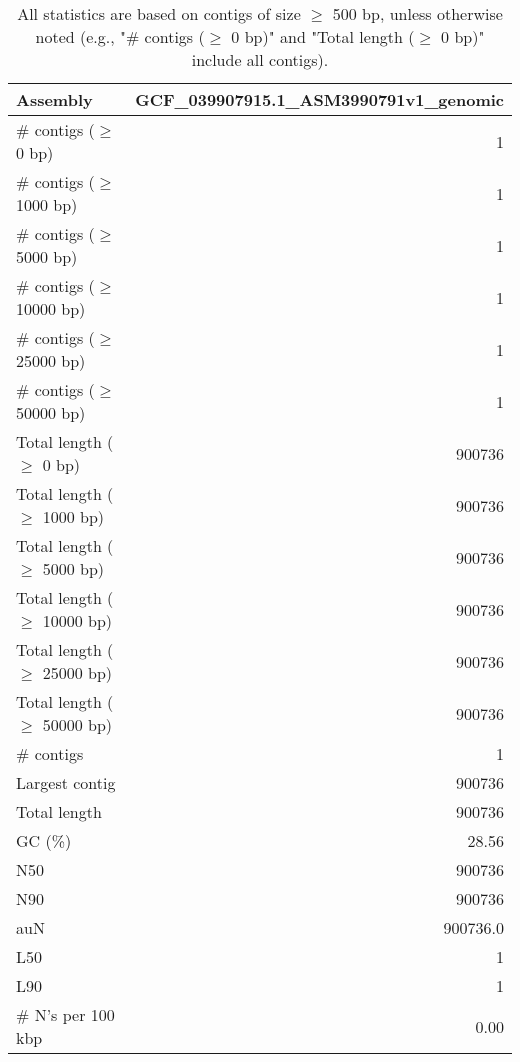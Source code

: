 \documentclass[12pt,a4paper]{article}
\begin{document}
\begin{table}[ht]
\begin{center}
\caption{All statistics are based on contigs of size $\geq$ 500 bp, unless otherwise noted (e.g., "\# contigs ($\geq$ 0 bp)" and "Total length ($\geq$ 0 bp)" include all contigs).}
\begin{tabular}{|l*{1}{|r}|}
\hline
Assembly & GCF\_039907915.1\_ASM3990791v1\_genomic \\ \hline
\# contigs ($\geq$ 0 bp) & 1 \\ \hline
\# contigs ($\geq$ 1000 bp) & 1 \\ \hline
\# contigs ($\geq$ 5000 bp) & 1 \\ \hline
\# contigs ($\geq$ 10000 bp) & 1 \\ \hline
\# contigs ($\geq$ 25000 bp) & 1 \\ \hline
\# contigs ($\geq$ 50000 bp) & 1 \\ \hline
Total length ($\geq$ 0 bp) & 900736 \\ \hline
Total length ($\geq$ 1000 bp) & 900736 \\ \hline
Total length ($\geq$ 5000 bp) & 900736 \\ \hline
Total length ($\geq$ 10000 bp) & 900736 \\ \hline
Total length ($\geq$ 25000 bp) & 900736 \\ \hline
Total length ($\geq$ 50000 bp) & 900736 \\ \hline
\# contigs & 1 \\ \hline
Largest contig & 900736 \\ \hline
Total length & 900736 \\ \hline
GC (\%) & 28.56 \\ \hline
N50 & 900736 \\ \hline
N90 & 900736 \\ \hline
auN & 900736.0 \\ \hline
L50 & 1 \\ \hline
L90 & 1 \\ \hline
\# N's per 100 kbp & 0.00 \\ \hline
\end{tabular}
\end{center}
\end{table}
\end{document}
